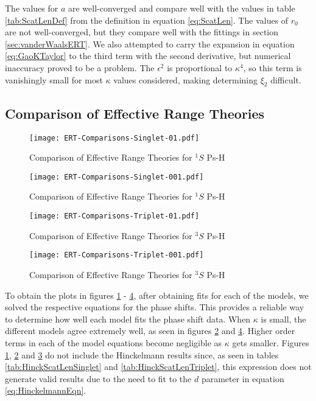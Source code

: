 \documentclass[Dissertation.tex]{subfiles}
\begin{document}
The values for $a$ are well-converged and compare well with the values in table \ref{tab:ScatLenDef} from the definition in equation \ref{eq:ScatLen}. The values of $r_0$ are not well-converged, but they compare well with the fittings in section \ref{sec:vanderWaalsERT}. We also attempted to carry the expansion in equation \ref{eq:GaoKTaylor} to the third term with the second derivative, but numerical inaccuracy proved to be a problem. The $\epsilon^2$ is proportional to $\kappa^4$, so this term is vanishingly small for most $\kappa$ values considered, making determining $\xi_2$ difficult.


\subsection{Comparison of Effective Range Theories}

\begin{figure}[H]
	\centering
	\texttt{[image: ERT-Comparisons-Singlet-01.pdf]}
	\caption{Comparison of Effective Range Theories for $^1S$ Ps-H}
	\label{fig:ERT-Comparisons-Singlet-01}
\end{figure}

\begin{figure}[H]
	\centering
	\texttt{[image: ERT-Comparisons-Singlet-001.pdf]}
	\caption{Comparison of Effective Range Theories for $^1S$ Ps-H}
	\label{fig:ERT-Comparisons-Singlet-001}
\end{figure}

\begin{figure}[H]
	\centering
	\texttt{[image: ERT-Comparisons-Triplet-01.pdf]}
	\caption{Comparison of Effective Range Theories for $^3S$ Ps-H}
	\label{fig:ERT-Comparisons-Triplet-01}
\end{figure}

\begin{figure}[H]
	\centering
	\texttt{[image: ERT-Comparisons-Triplet-001.pdf]}
	\caption{Comparison of Effective Range Theories for $^3S$ Ps-H}
	\label{fig:ERT-Comparisons-Triplet-001}
\end{figure}

To obtain the plots in figures \ref{fig:ERT-Comparisons-Singlet-01} - \ref{fig:ERT-Comparisons-Triplet-001}, after obtaining fits for each of the models, we solved the respective equations for the phase shifts.  This provides a reliable way to determine how well each model fits the phase shift data. When $\kappa$ is small, the different models agree extremely well, as seen in figures \ref{fig:ERT-Comparisons-Singlet-001} and \ref{fig:ERT-Comparisons-Triplet-001}. Higher order terms in each of the model equations become negligible as $\kappa$ gets smaller. Figures \ref{fig:ERT-Comparisons-Singlet-01}, \ref{fig:ERT-Comparisons-Singlet-001} and \ref{fig:ERT-Comparisons-Triplet-01} do not include the Hinckelmann results since, as seen in tables \ref{tab:HinckScatLenSinglet} and \ref{tab:HinckScatLenTriplet}, this expression does not generate valid results due to the need to fit to the $d$ parameter in equation \ref{eq:HinckelmannEqn}.
\end{document}
